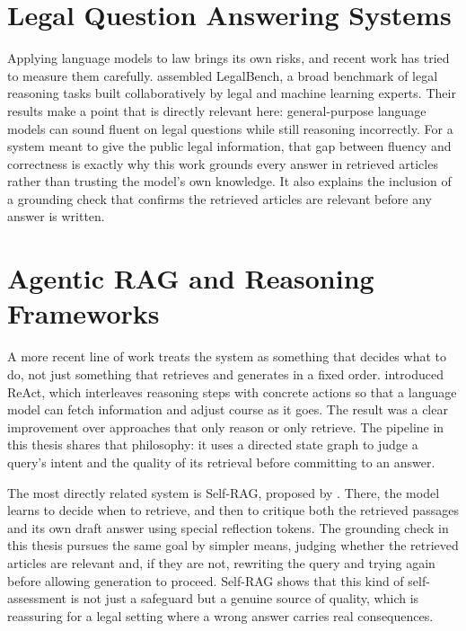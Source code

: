 \section{Legal Question Answering Systems}

\hs Applying language models to law brings its own risks, and recent work has tried to
measure them carefully. \citet{guha2023legalbench} assembled LegalBench, a broad benchmark
of legal reasoning tasks built collaboratively by legal and machine learning experts.
Their results make a point that is directly relevant here: general-purpose language models
can sound fluent on legal questions while still reasoning incorrectly. For a system meant
to give the public legal information, that gap between fluency and correctness is exactly
why this work grounds every answer in retrieved articles rather than trusting the model's
own knowledge. It also explains the inclusion of a grounding check that confirms the
retrieved articles are relevant before any answer is written.

\section{Agentic RAG and Reasoning Frameworks}

\hs A more recent line of work treats the system as something that decides what to do,
not just something that retrieves and generates in a fixed order. \citet{yao2023react}
introduced ReAct, which interleaves reasoning steps with concrete actions so that a
language model can fetch information and adjust course as it goes. The result was a clear
improvement over approaches that only reason or only retrieve. The pipeline in this thesis
shares that philosophy: it uses a directed state graph to judge a query's intent and the
quality of its retrieval before committing to an answer.

\hs The most directly related system is Self-RAG, proposed by \citet{asai2024selfrag}.
There, the model learns to decide when to retrieve, and then to critique both the
retrieved passages and its own draft answer using special reflection tokens. The grounding
check in this thesis pursues the same goal by simpler means, judging whether the retrieved
articles are relevant and, if they are not, rewriting the query and trying again before
allowing generation to proceed. Self-RAG shows that this kind of self-assessment is not
just a safeguard but a genuine source of quality, which is reassuring for a legal setting
where a wrong answer carries real consequences.

